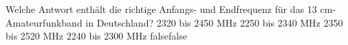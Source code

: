     {Welche Antwort enthält die richtige Anfangs- und Endfrequenz für das 13 cm-Amateurfunkband in Deutschland?}
    {2320 bis 2450 MHz}
    {2250 bis 2340 MHz}
    {2350 bis 2520 MHz}
    {2240 bis 2300 MHz}
    {false}{false}